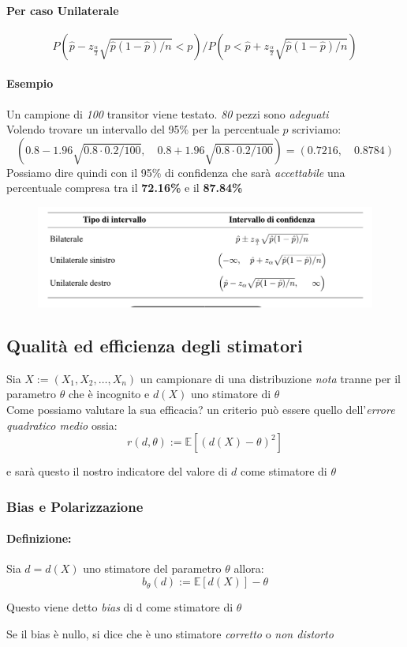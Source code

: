 \documentclass[]{article}
\newcommand{\ev}{\mathbb{E}[X]}
\renewcommand{\ev}[1]{\mathbb{E}[#1]}
\newcommand{\definizione}{\paragraph{Definizione:}}
\begin{document}
    \paragraph{Per caso Unilaterale}
    \[ P \left(\hat{p} - z_{\frac{\alpha}{2}} \sqrt{\hat{p} (1- \hat{p}) /n} < p \right) / P \left(p < \hat{p} + z_{\frac{\alpha}{2}} \sqrt{\hat{p} (1-\hat{p}) / n} \right)\]
    \paragraph{Esempio} Un campione di \textit{100} transitor viene testato. \textit{80} pezzi sono \textit{adeguati} \\
    Volendo trovare un intervallo del 95\% per la percentuale $p$ scriviamo:
    \[ \left(0.8 - 1.96 \sqrt{0.8 \cdot 0.2 / 100}, \quad 0.8 + 1.96 \sqrt{0.8 \cdot 0.2 / 100} \right) = (0.7216, \quad 0.8784) \]
    Possiamo dire quindi con il 95\% di confidenza che sarà \textit{accettabile} una percentuale compresa tra il \textbf{72.16\%} e il \textbf{87.84\%}
    \begin{figure}[H]
        \includegraphics[width=\textwidth]{images/boh_3.png}
    \end{figure}
    \subsection{Qualità ed efficienza degli stimatori}
    Sia $X := (X_1, X_2, \ldots, X_n)$ un campionare di una distribuzione \textit{nota} tranne per il parametro $\theta$ che è incognito e $d(X)$ uno stimatore di $\theta$ \\
    Come possiamo valutare la sua efficacia? un criterio può essere quello dell'\textit{errore quadratico medio} ossia:
    \[ r(d, \theta) := \ev{(d(X) - \theta)^2} \]
    \centerline{e sarà questo il nostro indicatore del valore di $d$ come stimatore di $\theta$}
    \subsubsection{Bias e Polarizzazione}
    \definizione Sia $d= d(X)$ uno stimatore del parametro $\theta$ allora:
    \[ b_\theta (d) := \ev{d(X)} - \theta \]
    \centerline{Questo viene detto \textit{bias} di d come stimatore di $\theta$}
    \centerline{Se il bias è nullo, si dice che è uno stimatore \textit{corretto} o \textit{non distorto} }
\end{document}

